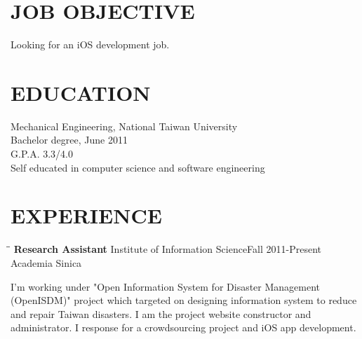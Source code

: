 \documentclass{res}
\begin{document}
\begin{resume}

\section{JOB OBJECTIVE}          
Looking for an iOS development job.
 
\section{EDUCATION}          
    Mechanical Engineering, National Taiwan University \\
    Bachelor degree, June 2011\\
    G.P.A. 3.3/4.0\\
    Self educated in computer science and software engineering \\

 
\section{EXPERIENCE}
   \vspace{-0.1in}	
   \begin{tabbing}
   \hspace{2.3in}\= \hspace{2.6in}\= \kill %
    {\bf Research Assistant} \>Institute of Information Science\>Fall 2011-Present\\
                             \>Academia Sinica
   \end{tabbing}\vspace{-20pt}      %
    I'm working under "Open Information System for Disaster Management
    (OpenISDM)" project which targeted on designing information system to reduce
    and repair Taiwan disasters. I am the project website constructor and
    administrator. I response for a crowdsourcing project and iOS app
    development.
    

\end{resume}
\end{document}
